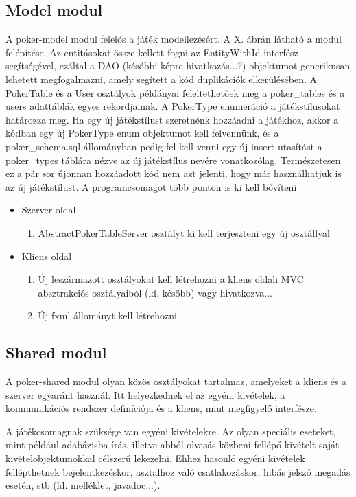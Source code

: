 \subsection{Model modul} \label{sec:poker-model}
A poker-model modul felelős a játék modellezésért. A X. ábrán látható a modul felépítése. Az entitásokat össze kellett fogni az EntityWithId interfész segítségével, ezáltal a DAO (későbbi képre hivatkozás...?) objektumot generikusan lehetett megfogalmazni, amely segített a kód duplikációk elkerülésében. A PokerTable és a User osztályok példányai feleltethetőek meg a poker\_tables és a users adattáblák egyes rekordjainak. A PokerType enumeráció a játékstílusokat határozza meg. Ha egy új játékstílust szeretnénk hozzáadni a játékhoz, akkor a kódban egy új PokerType enum objektumot kell felvennünk, és a poker\_schema.sql állományban pedig fel kell venni egy új insert utasítást a poker\_types táblára nézve az új játékstílus nevére vonatkozólag. Természetesen ez a pár sor újonnan hozzáadott kód nem azt jelenti, hogy már használhatjuk is az új játékstílust. A programcsomagot több ponton is ki kell bővíteni
\begin{itemize}[leftmargin=2cm]
	\item Szerver oldal
		\begin{enumerate}
			\item AbstractPokerTableServer osztályt ki kell terjeszteni egy új osztállyal
		\end{enumerate}
	\item Kliens oldal
		\begin{enumerate}
			\item Új leszármazott osztályokat kell létrehozni a kliens oldali MVC absztrakciós osztályaiból (ld. később) vagy hivatkozva...
			\item Új fxml állományt kell létrehozni
		\end{enumerate}
\end{itemize}

\subsection{Shared modul}
A poker-shared modul olyan közös osztályokat tartalmaz, amelyeket a kliens és a szerver egyaránt használ. Itt helyezkednek el az egyéni kivételek, a kommunikációs rendszer definíciója és a kliens, mint megfigyelő interfésze.

A játékcsomagnak szüksége van egyéni kivételekre. Az olyan speciális eseteket, mint például adabázisba írás, illetve abból olvasás közbeni fellépő kivételt saját kivételobjektumokkal célszerű lekezelni. Ehhez hasonló egyéni kivételek fellépthetnek bejelentkezéskor, asztalhoz való csatlakozáskor, hibás jelszó megadás esetén, stb (ld. melléklet, javadoc...).

